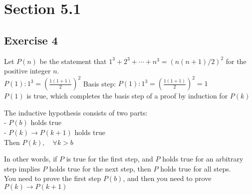 \documentclass[12pt]{article}
\begin{document}
    

    \section{Section 5.1} 

    \subsection{Exercise 4}
    Let $P(n)$ be the statement that $1^3 + 2^3 + \cdots + n^3 = (n(n + 1)/2)^2$ for the positive integer $n$.\\
        
        $P(1): 1^3 = (\frac{1(1+1)}{2})^2$
        Basis step:
            $P(1): 1^3 = (\frac{1(1+1)}{2})^2 = 1$ \\
            $P(1)$ is true, which completes the basis step of a proof by
                induction for $P(k)$
    
        The inductive hypothesis consists of two parts: \\
            - $P(b)$ holds true \\
            - $P(k) \rightarrow P(k+1)$ holds true\\
            Then $P(k), \quad \forall k > b$
    
            In other words, if $P$ is true for the first step, and $P$ holds true for an arbitrary step implies $P$ holds true for the next step, then $P$ holds true for all steps. \\
    
        You need to prove the first step $P(b)$, and then you need to prove
            $P(k) \rightarrow P(k+1)$
    
\end{document}
